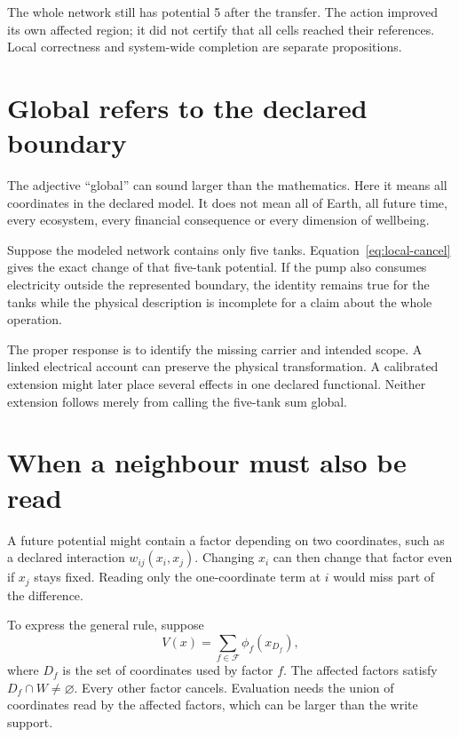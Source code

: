 The whole network still has potential 5 after the transfer. The action improved its own affected region; it did not certify that all cells reached their references. Local correctness and system-wide completion are separate propositions.


\section{Global refers to the declared boundary}
The adjective ``global'' can sound larger than the mathematics. Here it means all coordinates in the declared model. It does not mean all of Earth, all future time, every ecosystem, every financial consequence or every dimension of wellbeing.

Suppose the modeled network contains only five tanks. Equation~\eqref{eq:local-cancel} gives the exact change of that five-tank potential. If the pump also consumes electricity outside the represented boundary, the identity remains true for the tanks while the physical description is incomplete for a claim about the whole operation.

The proper response is to identify the missing carrier and intended scope. A linked electrical account can preserve the physical transformation. A calibrated extension might later place several effects in one declared functional. Neither extension follows merely from calling the five-tank sum global.

\section{When a neighbour must also be read}
A future potential might contain a factor depending on two coordinates, such as a declared interaction $w_{ij}(x_i,x_j)$. Changing $x_i$ can then change that factor even if $x_j$ stays fixed. Reading only the one-coordinate term at $i$ would miss part of the difference.

To express the general rule, suppose
\begin{equation}
 V(x)=\sum_{f\in\mathcal F}\phi_f(x_{D_f}),
\end{equation}
where $D_f$ is the set of coordinates used by factor $f$. The affected factors satisfy $D_f\cap W\ne\varnothing$. Every other factor cancels. Evaluation needs the union of coordinates read by the affected factors, which can be larger than the write support.

